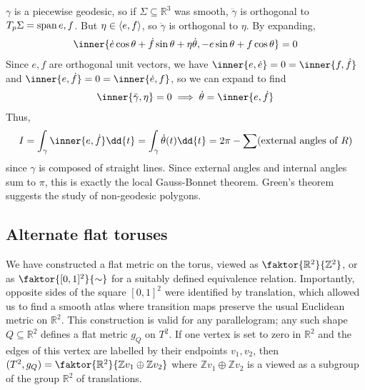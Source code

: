 $\gamma$ is a piecewise geodesic, so if $\Sigma \subseteq \mathbb R^3$ was smooth, $\ddot \gamma$ is orthogonal to $T_p \Sigma = \operatorname{span}{e,f}$.
But $\eta \in \left\langle{} e,f \right\rangle$, so $\ddot \gamma$ is orthogonal to $\eta$.
By expanding,
\begin{align*}
	\inner{\dot e \cos \theta + \dot f \sin \theta + \eta \dot \theta, -e\sin\theta + f\cos \theta} = 0
\end{align*}
Since $e, f$ are orthogonal unit vectors, we have $\inner{e,\dot e} = 0 = \inner{f,\dot f}$ and $\inner{e,\dot f} = 0 = \inner{\dot e, f}$, so we can expand to find
\begin{align*}
	\inner{\ddot \gamma,\eta} = 0 \implies \dot \theta = \inner{e,\dot f}
\end{align*}
Thus,
\begin{align*}
	I = \int_\gamma \inner{e,\dot f} \dd{t} = \int_\gamma \dot \theta(t) \dd{t} = 2\pi - \sum(\text{external angles of } R)
\end{align*}
since $\gamma$ is composed of straight lines.
Since external angles and internal angles sum to $\pi$, this is exactly the local Gauss-Bonnet theorem.
Green's theorem suggests the study of non-geodesic polygons.

\subsection{Alternate flat toruses}
We have constructed a flat metric on the torus, viewed as $\faktor{\mathbb R^2}{\mathbb Z^2}$, or as $\faktor{[0,1]^2}{\sim}$ for a suitably defined equivalence relation.
Importantly, opposite sides of the square $[0,1]^2$ were identified by translation, which allowed us to find a smooth atlas where transition maps preserve the usual Euclidean metric on $\mathbb R^2$.
This construction is valid for any parallelogram; any such shape $Q \subseteq \mathbb R^2$ defines a flat metric $g_Q$ on $T^2$.
If one vertex is set to zero in $\mathbb R^2$ and the edges of this vertex are labelled by their endpoints $v_1, v_2$, then $(T^2, g_Q) = \faktor{\mathbb R^2}{\mathbb Z v_1 \oplus \mathbb Z v_2}$ where $\mathbb Z v_1 \oplus \mathbb Z v_2$ is a viewed as a subgroup of the group $\mathbb R^2$ of translations.

